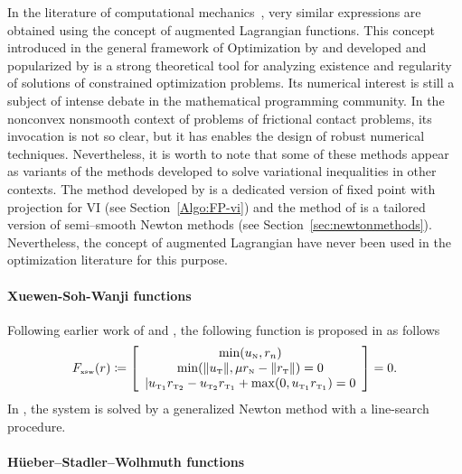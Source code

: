 {\begin{remark}
  \label{Rem:AugmentedLagrangian}
  In the literature of computational mechanics~\cite{Curnier.Alart88,Simo.Laursen1992,Alart.Curnier1991}, very similar expressions are obtained using the concept of augmented Lagrangian functions. This concept introduced in the general framework of Optimization by \cite{Hestenes1969} and developed and popularized by \cite{Rockafellar1974,Rockafellar1993} is a strong theoretical  tool for analyzing existence and regularity of solutions of constrained optimization problems. Its numerical interest is still a subject of intense debate in the mathematical programming community. In the nonconvex  nonsmooth context of problems of frictional contact problems, its invocation is not so clear, but it has enables the design of robust numerical techniques. Nevertheless, it is worth to note that some of these methods appear as variants of the methods developed to solve variational inequalities in other contexts. The method developed by \cite{Simo.Laursen1992} is a dedicated version of fixed point with projection for VI (see Section~\ref{Algo:FP-vi}) and the method of \cite{Alart.Curnier1991} is a tailored version of semi--smooth Newton methods (see Section~\ref{sec:newtonmethods}). Nevertheless, the concept of augmented Lagrangian have never been used in the optimization literature for this purpose.
\end{remark}

\paragraph{Xuewen-Soh-Wanji functions}
Following earlier work of \cite{Park.Kwak1994} and \cite{Leung.ea1998}, the following function is proposed in \citep{Xuewen.ea2000} as follows
\begin{equation}
  \label{eq:XSW-II}
  F_{\xswtwo}(r) \coloneqq \left[
    \begin{array}{c}
      \min(u_\n,r_n)\\
      \min(\|u_\t\|, \mu r_\n - \|r_\t\|)=0\\
      | u_{\t_1} r_{\t_2} -  u_{\t_2} r_{\t_1} + \max(0,u_{\t_1} r_{\t_1} ) =0
  \end{array}\right] =0.
\end{equation}
In \citep{Xuewen.ea2000}, the system is solved by a generalized Newton method with a line-search procedure.

\paragraph{H\"{u}eber--Stadler--Wolhmuth functions}

}
